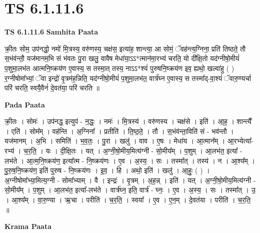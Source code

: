 \documentclass[17pt]{extarticle}
\begin{document}
\section{ TS 6.1.11.6 }

\textbf{TS 6.1.11.6 } \newline
\textbf{Samhita Paata} \newline

क्री॒तः सोम॒ उप॑नद्धो॒ नमो॑ मि॒त्रस्य॒ वरु॑णस्य॒ चक्ष॑स॒ इत्या॑ह॒ शान्त्या॒ आ सोमं॒ ॅवह॑न्त्य॒ग्निना॒ प्रति॑ तिष्ठते॒ तौ स॒भंव॑न्तौ॒ यज॑मानम॒भि सं भ॑वतः पु॒रा खलु॒ वावैष मेधा॑या॒ऽऽ*त्मान॑मा॒रभ्य॑ चरति॒ यो दी᳚क्षि॒तो यद॑ग्नीषो॒मीयं॑ प॒शुमा॒लभ॑त आत्मनि॒ष्क्रय॑ण ए॒वास्य॒ स तस्मा॒त् तस्य॒ नाऽऽ*श्यं॑ पुरुषनि॒ष्क्रय॑ण इव॒ ह्यथो॒ खल्वा॑हु ( ) र॒ग्नीषोमा᳚भ्यां॒ ॅवा इन्द्रो॑ वृ॒त्रम॑ह॒न्निति॒ यद॑ग्नीषो॒मीयं॑ प॒शुमा॒लभ॑त॒ वार्त्र॑घ्न ए॒वास्य॒ स तस्मा᳚द्-वा॒श्यं॑ ॅवारु॒ण्यर्चा परि॑ चरति॒ स्वयै॒वैनं॑ दे॒वत॑या॒ परि॑ चरति ॥ \newline

\textbf{Pada Paata} \newline

क्री॒तः । सोमः॑ । उप॑नद्ध॒ इत्युप॑ - न॒द्धः॒ । नमः॑ । मि॒त्रस्य॑ । वरु॑णस्य । चक्ष॑से । इति॑ । आ॒ह॒ । शान्त्यै᳚ । एति॑ । सोम᳚म् । वह॑न्ति । अ॒ग्निना᳚ । प्रतीति॑ । ति॒ष्ठ॒ते॒ । तौ । स॒भंव॑न्ता॒विति॑ सं - भव॑न्तौ । यज॑मानम् । अ॒भि । समिति॑ । भ॒व॒तः॒ । पु॒रा । खलु॑ । वाव । ए॒षः । मेधा॑य । आ॒त्मान᳚म् । आ॒रभ्येत्या᳚-रभ्य॑ । च॒र॒ति॒ । यः । दी॒क्षि॒तः । यत् । अ॒ग्नी॒षो॒मीय॒मित्य॑ग्नी - सो॒मीय᳚म् । प॒शुम् । आ॒लभ॑त॒ इत्या᳚ - लभ॑ते । आ॒त्म॒नि॒ष्क्रय॑ण॒ इत्या᳚त्म - नि॒ष्क्रय॑णः । ए॒व । अ॒स्य॒ । सः । तस्मा᳚त् । तस्य॑ । न । आ॒श्य᳚म् । पु॒रु॒ष॒नि॒ष्क्रय॑ण॒ इति॑ पुरुष - नि॒ष्क्रय॑णः । इ॒व॒ । हि । अथो॒ इति॑ । खलु॑ । आ॒हुः॒ ( ) । अ॒ग्नीषोमा᳚भ्या॒मित्य॒ग्नी - सोमा᳚भ्याम् । वै । इन्द्रः॑ । वृ॒त्रम् । अ॒ह॒न्न् । इति॑ । यत् । अ॒ग्नी॒षो॒मीय॒मित्य॑ग्नी - सो॒मीय᳚म् । प॒शुम् । आ॒लभ॑त॒ इत्या᳚-लभ॑ते । वार्त्र॑घ्न॒ इति॒ वार्त्र॑ - घ्नः॒ । ए॒व । अ॒स्य॒ । सः । तस्मा᳚त् । उ॒ । आ॒श्य᳚म् । वा॒रु॒ण्या । ऋ॒चा । परीति॑ । च॒र॒ति॒ । स्वया᳚ । ए॒व । ए॒न॒म् । दे॒वत॑या । परीति॑ । च॒र॒ति॒ ॥  \newline


\textbf{Krama Paata} \newline
\end{document}
